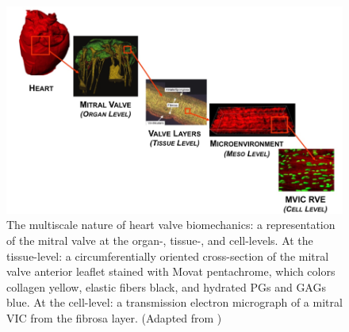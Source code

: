 \begin{figure}
\centering
\includegraphics[width=\textwidth]{Images/chapter1/multiscalevalve.png}
\caption{The multiscale nature of heart valve biomechanics: a representation of the mitral valve at the organ-, tissue-, and cell-levels. At the tissue-level: a circumferentially oriented cross-section of the mitral valve anterior leaflet stained with Movat pentachrome, which colors collagen yellow, elastic fibers black, and hydrated PGs and GAGs blue. At the cell-level: a transmission electron micrograph of a mitral VIC from the fibrosa layer. (Adapted from \cite{salma_heart_2016})}
\label{fig:multiscalevalve}
\end{figure}



